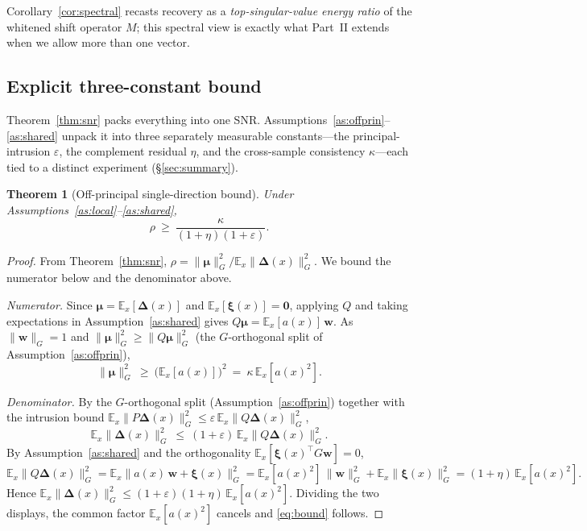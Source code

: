 \documentclass[11pt]{article}
\newtheorem{theorem}{Theorem}[section]
\newcommand{\E}{\mathbb{E}}
\newcommand{\bw}{\mathbf{w}}
\newcommand{\bDelta}{\bm{\Delta}}
\newcommand{\bmu}{\bm{\mu}}
\newcommand{\bxi}{\bm{\xi}}
\newcommand{\Gnorm}[1]{\lVert #1\rVert_G}
\begin{document}
\noindent
Corollary~\ref{cor:spectral} recasts recovery as a \emph{top-singular-value energy ratio} of the
whitened shift operator $M$; this spectral view is exactly what Part~II extends when we
allow more than one vector.

\subsection{Explicit three-constant bound}\label{sub:bound}
Theorem~\ref{thm:snr} packs everything into one SNR. Assumptions~\ref{as:offprin}--\ref{as:shared}
unpack it into three separately measurable constants---the principal-intrusion $\varepsilon$, the
complement residual $\eta$, and the cross-sample consistency $\kappa$---each tied to a distinct
experiment (\S\ref{sec:summary}).

\begin{theorem}[Off-principal single-direction bound]\label{thm:bound}
Under Assumptions~\ref{as:local}--\ref{as:shared},
\begin{equation}\label{eq:bound}
\boxed{\ \rho\ \ge\ \frac{\kappa}{(1+\eta)(1+\varepsilon)}.\ }
\end{equation}
\end{theorem}
\begin{proof}
From Theorem~\ref{thm:snr}, $\rho=\Gnorm{\bmu}^2/\E_x\Gnorm{\bDelta(x)}^2$. We bound the numerator
below and the denominator above.

\emph{Numerator.} Since $\bmu=\E_x[\bDelta(x)]$ and $\E_x[\bxi(x)]=\mathbf 0$, applying $Q$ and
taking expectations in Assumption~\ref{as:shared} gives $Q\bmu=\E_x[a(x)]\,\bw$. As $\Gnorm{\bw}=1$
and $\Gnorm{\bmu}^2\ge\Gnorm{Q\bmu}^2$ (the $G$-orthogonal split of Assumption~\ref{as:offprin}),
\begin{equation*}
\Gnorm{\bmu}^2\ \ge\ \big(\E_x[a(x)]\big)^2\ =\ \kappa\,\E_x[a(x)^2].
\end{equation*}

\emph{Denominator.} By the $G$-orthogonal split (Assumption~\ref{as:offprin}) together with the
intrusion bound $\E_x\Gnorm{P\bDelta(x)}^2\le\varepsilon\,\E_x\Gnorm{Q\bDelta(x)}^2$,
\begin{equation*}
\E_x\Gnorm{\bDelta(x)}^2\ \le\ (1+\varepsilon)\,\E_x\Gnorm{Q\bDelta(x)}^2 .
\end{equation*}
By Assumption~\ref{as:shared} and the orthogonality $\E_x[\bxi(x)^\top G\bw]=0$,
\begin{equation*}
\E_x\Gnorm{Q\bDelta(x)}^2=\E_x\Gnorm{a(x)\,\bw+\bxi(x)}^2
=\E_x[a(x)^2]\,\Gnorm{\bw}^2+\E_x\Gnorm{\bxi(x)}^2=(1+\eta)\,\E_x[a(x)^2].
\end{equation*}
Hence $\E_x\Gnorm{\bDelta(x)}^2\le(1+\varepsilon)(1+\eta)\,\E_x[a(x)^2]$. Dividing the two displays,
the common factor $\E_x[a(x)^2]$ cancels and \eqref{eq:bound} follows.
\end{proof}
\end{document}
